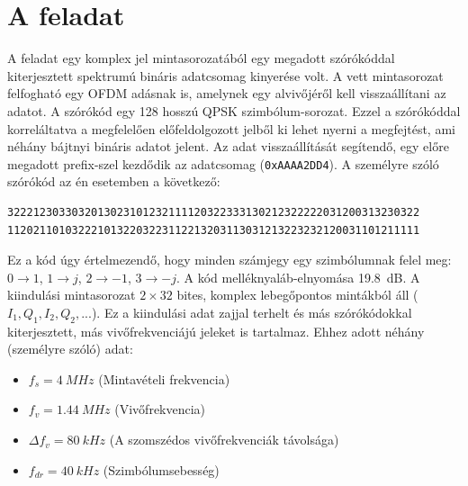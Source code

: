 \section{A feladat}
	A feladat egy komplex jel mintasorozatából egy megadott szórókóddal kiterjesztett spektrumú bináris adatcsomag kinyerése volt. A vett mintasorozat felfogható egy OFDM adásnak is, amelynek egy alvivőjéről kell visszaállítani az adatot. A szórókód egy 128 hosszú QPSK szimbólum-sorozat. Ezzel a szórókóddal korreláltatva a megfelelően előfeldolgozott jelből ki lehet nyerni a megfejtést, ami néhány bájtnyi bináris adatot jelent. Az adat visszaállítását segítendő, egy előre megadott prefix-szel kezdődik az adatcsomag (\verb|0xAAAA2DD4|). A személyre szóló szórókód az én esetemben a következő:
	\begin{lstlisting}
3222123033032013023101232111120322333130212322222031200313230322
1120211010322210132203223112213203113031213223232120031101211111\end{lstlisting}
	Ez a kód úgy értelmezendő, hogy minden számjegy egy szimbólumnak felel meg: $0 \rightarrow 1$, $1 \rightarrow j$, $2 \rightarrow -1$, $3 \rightarrow -j$. A kód melléknyaláb-elnyomása \qty{19,8}{dB}. A kiindulási mintasorozat $2\times32$ bites, komplex lebegőpontos mintákból áll ($I_1,Q_1,I_2,Q_2,...$). Ez a kiindulási adat zajjal terhelt és más szórókódokkal kiterjesztett, más vivőfrekvenciájú jeleket is tartalmaz. Ehhez adott néhány (személyre szóló) adat:
	\begin{itemize}
		\item $f_s=\qty{4}{MHz}$ (Mintavételi frekvencia)
		\item $f_v=\qty{1,44}{MHz}$ (Vivőfrekvencia)
		\item $\Delta f_v=\qty{80}{kHz}$ (A szomszédos vivőfrekvenciák távolsága)
		\item $f_{dr}=\qty{40}{kHz}$ (Szimbólumsebesség)
	\end{itemize}
